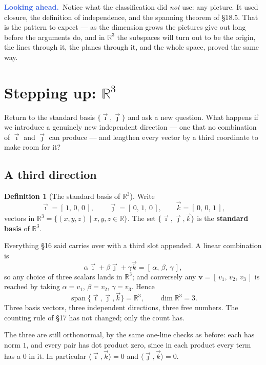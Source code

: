 \documentclass[11pt]{article}
\theoremstyle{definition}
\newtheorem{defn}{Definition}[section]
\theoremstyle{remark}
\newcommand{\lookahead}{\par\smallskip\noindent
  \textbf{\sffamily\textcolor{RoyalBlue}{Looking ahead.}}\ \ignorespaces}
\newcommand{\R}{\mathbb{R}}
\newcommand{\vc}[1]{\mathbf{#1}}
\newcommand{\ivec}{\vec{\imath}}
\newcommand{\jvec}{\vec{\jmath}}
\newcommand{\kvec}{\vec{k}}
\DeclareMathOperator{\spanop}{span}   %
\begin{document}
\lookahead Notice what the classification did \emph{not} use: any picture. It
used closure, the definition of independence, and the spanning theorem of
\S18.5. That is the pattern to expect --- as the dimension grows the pictures
give out long before the arguments do, and in $\R^{3}$ the subspaces will turn
out to be the origin, the lines through it, the planes through it, and the whole
space, proved the same way.

\section{Stepping up: \texorpdfstring{$\R^{3}$}{R3}}
Return to the standard basis $\{\ivec,\jvec\}$ and ask a new question. What
happens if we introduce a genuinely new independent direction --- one that no
combination of $\ivec$ and $\jvec$ can produce --- and lengthen every vector by a
third coordinate to make room for it?

\subsection{A third direction}
\begin{defn}[The standard basis of $\R^{3}$]
Write
\[
  \ivec = [\,1,\,0,\,0\,],
  \qquad
  \jvec = [\,0,\,1,\,0\,],
  \qquad
  \kvec = [\,0,\,0,\,1\,] ,
\]
vectors in
$\R^{3}=\{(x,y,z)\mid x,y,z\in\R\}$. The set $\{\ivec,\jvec,\kvec\}$ is the
\textbf{standard basis} of $\R^{3}$.
\end{defn}

\noindent Everything \S16 said carries over with a third slot appended. A linear
combination is
\[
  \alpha\ivec + \beta\jvec + \gamma\kvec = [\,\alpha,\,\beta,\,\gamma\,] ,
\]
so any choice of three scalars lands in $\R^{3}$; and conversely any
$\vc{v}=[\,v_1,\,v_2,\,v_3\,]$ is reached by taking $\alpha=v_1$, $\beta=v_2$,
$\gamma=v_3$. Hence
\[
  \spanop\{\ivec,\jvec,\kvec\} = \R^{3},
  \qquad
  \dim\R^{3} = 3 .
\]
Three basis vectors, three independent directions, three free numbers. The
counting rule of \S17 has not changed; only the count has.

The three are still orthonormal, by the same one-line checks as before: each has
norm $1$, and every pair has dot product zero, since in each product every term
has a $0$ in it. In particular $\langle\ivec,\kvec\rangle=0$ and
$\langle\jvec,\kvec\rangle=0$.
\end{document}
